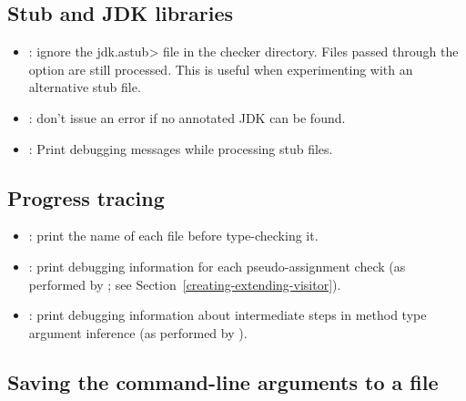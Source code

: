 \subsection{Stub and JDK libraries\label{creating-debugging-options-libraries}}

\begin{itemize}

\item {}:
  ignore the \<jdk.astub> file in the checker directory. Files passed
  through the  option are still processed. This is useful
  when experimenting with an alternative stub file.

\item {}:
  don't issue an error if no annotated JDK can be found.

\item {}:
  Print debugging messages while processing stub files.

\end{itemize}

\subsection{Progress tracing\label{creating-debugging-options-progress}}

\begin{itemize}

\item {}: print the name of each file before type-checking it.

\item {}: print debugging information for each
pseudo-assignment check (as performed by
; see
Section~\ref{creating-extending-visitor}).

\item {}: print debugging information
about intermediate steps in method type argument inference
(as performed by ).

\end{itemize}

\subsection{Saving the command-line arguments to a file\label{creating-debugging-options-output-args}}

